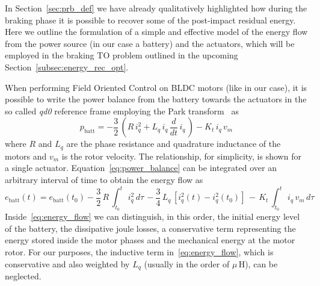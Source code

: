 In Section~\ref{sec:prb_def} we have already qualitatively highlighted how during the braking phase it is possible to recover some of the post-impact residual energy. Here we outline the formulation of a simple and effective model of the energy flow from the power source (in our case a battery) and the actuators, which will be employed in the braking TO problem outlined in the upcoming Section~\ref{subsec:energy_rec_opt}. 

When performing Field Oriented Control on BLDC motors (like in our case), it is possible to write the power balance from the battery towards the actuators in the so called \textit{qd0} reference frame employing the Park transform~\cite{foc::krause2013analysis} as 
\begin{equation}\label{eq:power_balance}
    p_{\mathrm{batt}} = - \dfrac{3}{2}\,\left(R\,i_{q}^2 + L_q\,i_{q}\,\dfrac{d}{dt}\,i_q\,\right) - K_t\,i_q\,v_m
\end{equation}
where $R$ and $L_q$ are the phase resistance and quadrature inductance of the motors and $v_m$ is the rotor velocity. The relationship, for simplicity, is shown for a single actuator. Equation~\eqref{eq:power_balance} can be integrated over an arbitrary interval of time to obtain the energy flow as
\begin{dmath} \label{eq:energy_flow}
e_{\mathrm{batt}}(t) = e_{\mathrm{batt}}(t_0)- \dfrac{3}{2}\,R\,\int_{t_0}^{t}\,i_{q}^2\,d\tau\,- \dfrac{3}{4}\,L_q\,\left[i_q^2(t) - i_q^2(t_0)\right]\,-\,K_t\,\int_{t_0}^{t}\,i_q\,v_{m}\,d\tau
\end{dmath}\vspace{-0.2cm}
Inside~\eqref{eq:energy_flow} we can distinguish, in this order, the initial energy level of the battery, the dissipative joule losses, a conservative term representing the energy stored inside the motor phases and the mechanical energy at the motor rotor. For our purposes, the inductive term in~\eqref{eq:energy_flow}, which is conservative and also weighted by $L_q$ (usually in the order of $\mu\,\mathrm{H}$), can be neglected. 

